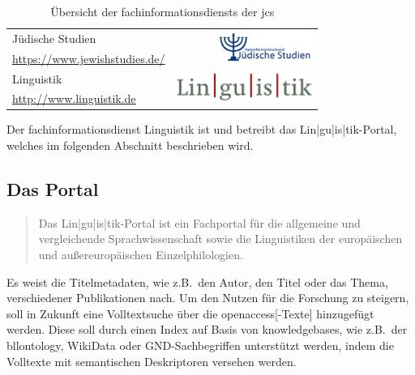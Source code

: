 \begin{table}
\begin{tabularx}{\textwidth}{l r}
		Jüdische Studien                                   & \multirow{2}{*}{\href{https://www.jewishstudies.de/}{\includegraphics[height=1cm]{figures/fid-js_160.png}}}        \\ \footnotesize{\url{https://www.jewishstudies.de/}} & \\[2ex]
		Linguistik                                         & \multirow{2}{*}{\href{http://www.linguistik.de/}{\includegraphics[height=1cm]{figures/linguistik_160.png}}}        \\ \footnotesize{\url{http://www.linguistik.de}} &
	\end{tabularx}
	\caption{Übersicht der \glspl{fachinformationsdienst} der \gls{jcs} \autocite{ub:sammlungen:fid}}
	\label{fig:fid:overview}
\end{table}

Der \gls{fachinformationsdienst} Linguistik ist
und betreibt das Lin|gu|is|tik-Portal,
welches im folgenden Abschnitt beschrieben wird.

\subsection{Das Portal}
\blockquote[\autocite{ub:projekte:fid-linguistik}]{Das Lin|gu|is|tik-Portal ist
	ein Fachportal für die allgemeine und vergleichende Sprachwissenschaft
	sowie die Linguistiken der europäischen und außereuropäischen Einzelphilologien.}
Es weist
die Titelmetadaten,
wie z.B.\, den Autor, den Titel oder das Thema,
verschiedener Publikationen nach.
Um den Nutzen für die Forschung zu steigern,
soll in Zukunft eine Volltextsuche über die \gls{openaccess}[-Texte]
hinzugefügt werden.
Diese soll durch einen Index auf Basis von \glspl{knowledgebase},
wie z.B.\, der \gls{bllontology}, WikiData oder GND-Sachbegriffen
unterstützt werden,
indem die Volltexte mit semantischen Deskriptoren versehen werden.

